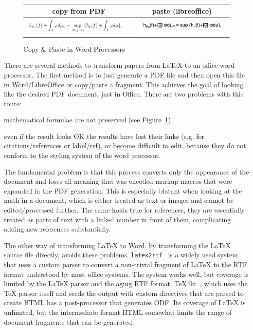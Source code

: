 \documentclass{llncs}
\begin{document}
\begin{figure}[ht]\centering\vspace*{-1em}
  \begin{tabular}{|c|c|}\hline%
    copy from PDF & paste (libreoffice)\\\hline
    \includegraphics[width=6cm]{mathsnippet} & 
    \includegraphics[width=5cm]{mathsnippet-libreoffice}\\\hline
  \end{tabular}
\caption{Copy \& Paste in Word Processors}\label{fig:cnp}\vspace*{-1em}
\end{figure}

There are several methods to transform papers from {\LaTeX} to an office word
processor. The first method is to just generate a PDF file and then open this file in
Word/LibreOffice or copy/paste a fragment. This achieves the goal of looking like the
desired PDF document, just in Office. There are two problems with this route:
\begin{inparaenum}[\em i\rm)]
\item mathematical formulae are not preserved (see Figure~\ref{fig:cnp})
\item even if the result looks OK the results have lost their links (e.g. for
  citations/references or label/ref), or become difficult to edit, because they do not
  conform to the styling system of the word processor.
\end{inparaenum}
The fundamental problem is that this process converts only the appearance of the document
and loses all meaning that was encoded markup macros that were expanded in the PDF
generation. This is especially blatant when looking at the math in a document, which is
either treated as text or images and cannot be edited/processed further. The same holds
true for references, they are essentially treated as parts of text with a linked number in
front of them, complicating adding new references substantially.

The other way of transforming {\LaTeX} to Word, by transforming the {\LaTeX} source file
directly, avoids these problems. \texttt{latex2rtf}~\cite{latex2rtf:on} is a widely used
system that uses a custom parser to convert a non-trivial fragment of {\LaTeX} to the RTF
format understood by most office systems. The system works well, but coverage is limited
by the {\LaTeX} parser and the aging RTF format.  TeX4ht~\cite{tex4ht:online}, which uses
the {\TeX} parser itself and seeds the output with custom directives that are parsed to
create HTML has a post-processor that generates ODF. Its coverage of {\LaTeX} is unlimited,
but the intermediate format HTML somewhat limits the range of document fragments that can
be generated. 
\end{document}
